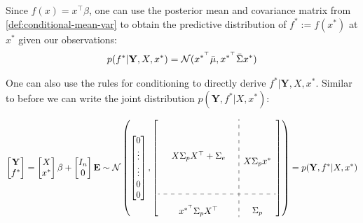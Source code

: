 Since $f(x) = x^{\top}\beta$, one can use the posterior mean and covariance matrix from
\ref{def:conditional-mean-var} to obtain the predictive distribution of $f^{\ast} := f(x^{\ast})$ at $x^{\ast}$
given our observations:
\begin{align}\label{def:predictive-dist}
    p(f^{\ast} | \mathbf{Y}, X, x^{\ast}) = \operatorname{\mathcal{N}}(x^{\ast^{\top}} \bar{\mu}, x^{\ast^{\top}} \bar{\Sigma} x^{\ast})
\end{align}

One can also use the rules for conditioning to directly derive $f^{\ast} | \mathbf{Y}, X, x^{\ast}$.
Similar to before we can write the joint distribution $p(\mathbf{Y}, f^{\ast}| X, x^{\ast})$:

\begin{gather}
    \begin{bmatrix}
        \mathbf{Y} \\
        f^{\ast}
    \end{bmatrix}
    = \begin{bmatrix} X \\ x^{\ast} \end{bmatrix} \beta + \begin{bmatrix} I_n \\ 0 \end{bmatrix}  \mathbf{E}
    \sim \N \left(
        \begin{bmatrix}
        0 \\
        \vdots \\
        \vdots \\
        0 \\
        0
        \end{bmatrix},
        \left[
        \begin{array}{ c:c c c }
            \begin{matrix}
                & & \\
                & & \\
                & & \\
                & X \Sigma_p X^{\top} + \Sigma_e & \\
                & & \\
                & & \\
                & & \\
            \end{matrix}
            & \begin{matrix} \\ \\ \\ X \Sigma_p x^{\ast} \\ \\ \\ \end{matrix} \\
            \hdashline \\
            \begin{matrix} &  x^{\ast^{\top}}  \Sigma_p X^{\top} & \end{matrix} & \Sigma_p
        \end{array}
        \right]
        \right)
    = p(\mathbf{Y}, f^{\ast}| X, x^{\ast})
\end{gather}

